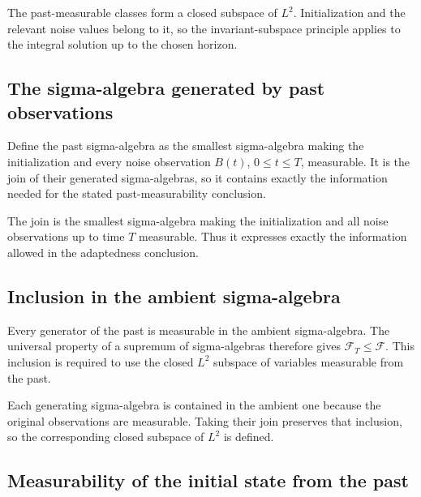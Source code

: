 \documentclass[11pt,a4paper]{report}
\begin{document}
The past-measurable classes form a closed subspace of \(L^2\). Initialization and the relevant noise values belong to it, so the invariant-subspace principle applies to the integral solution up to the chosen horizon.

\subsection{\texorpdfstring{The sigma-algebra generated by past observations}{The sigma-algebra generated by past observations}}
\label{report-step-UnadjustedLangevin-WeakForwardAdapted-lean-4}


Define the past sigma-algebra as the smallest sigma-algebra making the initialization and every noise observation \(B(t)\), \(0\le t\le T\), measurable. It is the join of their generated sigma-algebras, so it contains exactly the information needed for the stated past-measurability conclusion.



The join is the smallest sigma-algebra making the initialization and all noise observations up to time \(T\) measurable. Thus it expresses exactly the information allowed in the adaptedness conclusion.

\subsection{\texorpdfstring{Inclusion in the ambient sigma-algebra}{Inclusion in the ambient sigma-algebra}}
\label{report-step-UnadjustedLangevin-WeakForwardAdapted-lean-5}


Every generator of the past is measurable in the ambient sigma-algebra. The universal property of a supremum of sigma-algebras therefore gives \(\mathcal F_T\le\mathcal F\). This inclusion is required to use the closed \(L^2\) subspace of variables measurable from the past.



Each generating sigma-algebra is contained in the ambient one because the original observations are measurable. Taking their join preserves that inclusion, so the corresponding closed subspace of \(L^2\) is defined.

\subsection{\texorpdfstring{Measurability of the initial state from the past}{Measurability of the initial state from the past}}
\label{report-step-UnadjustedLangevin-WeakForwardAdapted-lean-6}
\end{document}
